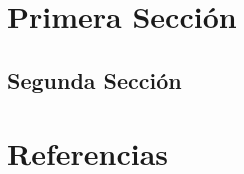 \documentclass{staprojteamusb}
\begin{document}
	
	
	\maketitle
	
	
	
	\hypertarget{primera-secciuxf3n}{%
 \section{Primera Sección}\label{primera-secciuxf3n}}

 \hypertarget{segunda-secciuxf3n}{%
 \subsection{Segunda Sección}\label{segunda-secciuxf3n}}

 \hypertarget{referencias}{%
 \section{Referencias}\label{referencias}}
	
	
	\nocite{*}
	\printbibliography
	
	
	
	
\end{document}
